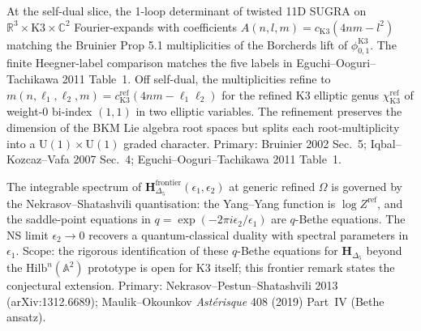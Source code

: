 \begin{remark}
\label{rem:oackdf-bruinier-borcherds-refinement}
At the self-dual slice, the 1-loop determinant of twisted 11D SUGRA on
$\mathbb R^3 \times \mathrm{K3} \times \mathbb C^2$ Fourier-expands
with coefficients $A(n, l, m) = c_{\mathrm K3}(4nm - l^2)$ matching the
Bruinier Prop 5.1 multiplicities of the Borcherds lift of
$\phi_{0,1}^{\mathrm K3}$. The finite Heegner-label comparison matches
the five labels in Eguchi--Ooguri--Tachikawa 2011 Table~1. Off
self-dual, the multiplicities refine to
$m(n, \ell_1, \ell_2, m) = c_{\mathrm K3}^{\mathrm{ref}}(4nm - \ell_1\ell_2)$
for the refined K3 elliptic genus $\chi_{\mathrm K3}^{\mathrm{ref}}$ of
weight-$0$ bi-index $(1, 1)$ in two elliptic variables. The refinement
preserves the dimension of the BKM Lie algebra root spaces but splits
each root-multiplicity into a $\mathrm U(1) \times \mathrm U(1)$
graded character. Primary: Bruinier 2002 Sec.~5; Iqbal--Kozcaz--Vafa
2007 Sec.~4; Eguchi--Ooguri--Tachikawa 2011 Table~1.
\end{remark}

\begin{remark}
\label{rem:oackdf-qbethe-nonselfdual}
The integrable spectrum of
$\mathbf H_{\Delta_5}^{\mathrm{frontier}}(\epsilon_1, \epsilon_2)$ at
generic refined $\Omega$ is governed by the Nekrasov--Shatashvili
quantisation: the Yang--Yang function is $\log Z^{\mathrm{ref}}$, and
the saddle-point equations in $q = \exp(-2\pi i \epsilon_2 / \epsilon_1)$
are $q$-Bethe equations. The NS limit $\epsilon_2 \to 0$ recovers a
quantum-classical duality with spectral parameters in $\epsilon_1$.
Scope: the rigorous identification of these $q$-Bethe equations for
$\mathbf H_{\Delta_5}$ beyond the $\mathrm{Hilb}^n(\mathbb A^2)$
prototype is open for K3 itself; this frontier remark states the
conjectural extension. Primary: Nekrasov--Pestun--Shatashvili 2013
(arXiv:1312.6689); Maulik--Okounkov \emph{Ast\'erisque} 408 (2019)
Part~IV (Bethe ansatz).
\end{remark}


